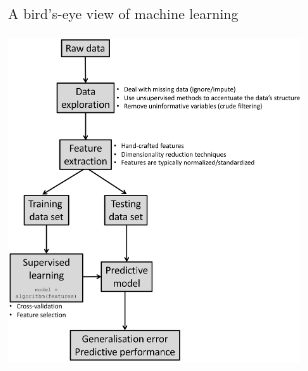 \documentclass[pdf]{beamer}
\begin{document}
\begin{frame}{A bird's-eye view of machine learning}
\begin{center}
	\includegraphics[width=0.58\textwidth]{birdview.png}
\end{center}
\end{frame}

\end{document}
